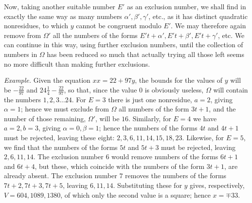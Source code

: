 Now, taking another suitable number \(E'\) as an exclusion number, we shall find in exactly the same way as many numbers \(\alpha',\allowbreak \beta',\allowbreak \gamma'\), etc., as it has distinct quadratic nonresidues, to which \(y\) cannot be congruent modulo \(E'\). We may therefore again remove from \(\Omega'\) all the numbers of the forms \(E't+\alpha',\allowbreak E't+\beta',\allowbreak E't+\gamma'\), etc. We can continue in this way, using further exclusion numbers, until the collection of numbers in \(\Omega\) has been reduced so much that actually trying all those left seems no more difficult than making further exclusions.

\textit{Example.} Given the equation \(xx=22+97y\), the bounds for the values of \(y\) will be \(-\frac{22}{97}\) and \(24\frac14-\frac{22}{97}\), so that, since the value \(0\) is obviously useless, \(\Omega\) will contain the numbers \(1,\allowbreak 2,\allowbreak 3\ldots24\). For \(E=3\) there is just one nonresidue, \(a=2\), giving \(\alpha=1\); hence we must exclude from \(\Omega\) all numbers of the form \(3t+1\), and the number of those remaining, \(\Omega'\), will be \(16\). Similarly, for \(E=4\) we have \(a=2,\allowbreak b=3\), giving \(\alpha=0,\allowbreak \beta=1\); hence the numbers of the forms \(4t\) and \(4t+1\) must be rejected, leaving these eight: \(2,\allowbreak 3,\allowbreak 6,\allowbreak 11,\allowbreak 14,\allowbreak 15,\allowbreak 18,\allowbreak 23\). Likewise, for \(E=5\), we find that the numbers of the forms \(5t\) and \(5t+3\) must be rejected, leaving \(2,\allowbreak 6,\allowbreak 11,\allowbreak 14\). The exclusion number \(6\) would remove numbers of the forms \(6t+1\) and \(6t+4\), but these, which coincide with the numbers of the form \(3t+1\), are already absent. The exclusion number \(7\) removes the numbers of the forms \(7t+2,\allowbreak 7t+3,\allowbreak 7t+5\), leaving \(6,\allowbreak 11,\allowbreak 14\). Substituting these for \(y\) gives, respectively, \(V=604,\allowbreak 1089,\allowbreak 1380\), of which only the second value is a square; hence \(x=\mp33\).

